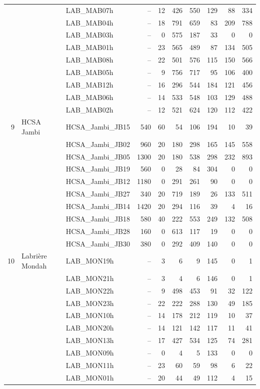 \documentclass[conference,a4paper]{IEEEtran}
\begin{document}
\begin{table}[!t]
\begin{tabular}{@{}r l l r r r r r r r@{}}
 &  & LAB\_MAB07h & -- & 12 & 426 & 550 & 129 & 88 & 334\\
 &  & LAB\_MAB04h & -- & 18 & 791 & 659 & 83 & 209 & 788\\
 &  & LAB\_MAB03h & -- & 0 & 575 & 187 & 33 & 0 & 0\\
 &  & LAB\_MAB01h & -- & 23 & 565 & 489 & 87 & 134 & 505\\
 &  & LAB\_MAB08h & -- & 22 & 501 & 576 & 115 & 150 & 566\\
 &  & LAB\_MAB05h & -- & 9 & 756 & 717 & 95 & 106 & 400\\
 &  & LAB\_MAB12h & -- & 16 & 296 & 544 & 184 & 121 & 456\\
 &  & LAB\_MAB06h & -- & 14 & 533 & 548 & 103 & 129 & 488\\
 &  & LAB\_MAB02h & -- & 12 & 521 & 624 & 120 & 112 & 422\\
\midrule
9 & HCSA Jambi & HCSA\_Jambi\_JB15 & 540 & 60 & 54 & 106 & 194 & 10 & 39\\
 &  & HCSA\_Jambi\_JB02 & 960 & 20 & 180 & 298 & 165 & 145 & 558\\
 &  & HCSA\_Jambi\_JB05 & 1300 & 20 & 180 & 538 & 298 & 232 & 893\\
 &  & HCSA\_Jambi\_JB19 & 560 & 0 & 28 & 84 & 304 & 0 & 0\\
 &  & HCSA\_Jambi\_JB12 & 1180 & 0 & 291 & 261 & 90 & 0 & 0\\
 &  & HCSA\_Jambi\_JB27 & 340 & 20 & 719 & 189 & 26 & 133 & 511\\
 &  & HCSA\_Jambi\_JB14 & 1420 & 20 & 294 & 116 & 39 & 4 & 16\\
 &  & HCSA\_Jambi\_JB18 & 580 & 40 & 222 & 553 & 249 & 132 & 508\\
 &  & HCSA\_Jambi\_JB28 & 160 & 0 & 613 & 117 & 19 & 0 & 0\\
 &  & HCSA\_Jambi\_JB30 & 380 & 0 & 292 & 409 & 140 & 0 & 0\\
\midrule
10 & Labri\`ere Mondah & LAB\_MON19h & -- & 3 & 6 & 9 & 145 & 0 & 1\\
 &  & LAB\_MON21h & -- & 3 & 4 & 6 & 146 & 0 & 1\\
 &  & LAB\_MON22h & -- & 9 & 498 & 453 & 91 & 32 & 122\\
 &  & LAB\_MON23h & -- & 22 & 222 & 288 & 130 & 49 & 185\\
 &  & LAB\_MON10h & -- & 14 & 178 & 212 & 119 & 10 & 37\\
 &  & LAB\_MON20h & -- & 14 & 121 & 142 & 117 & 11 & 41\\
 &  & LAB\_MON13h & -- & 17 & 427 & 534 & 125 & 74 & 281\\
 &  & LAB\_MON09h & -- & 0 & 4 & 5 & 133 & 0 & 0\\
 &  & LAB\_MON11h & -- & 23 & 60 & 59 & 98 & 6 & 22\\
 &  & LAB\_MON01h & -- & 20 & 44 & 49 & 112 & 4 & 15\\
\bottomrule
\end{tabular}
\end{table}
\end{document}
